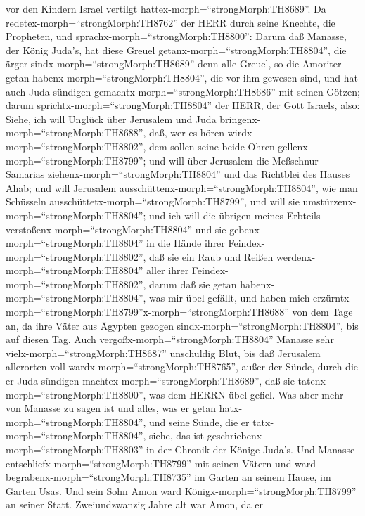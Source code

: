 vor den Kindern Israel vertilgt hattex-morph=``strongMorph:TH8689''.
 Da redetex-morph=``strongMorph:TH8762'' der HERR durch
seine Knechte, die Propheten, und sprachx-morph=``strongMorph:TH8800'':
 Darum daß Manasse, der König Juda's, hat diese Greuel
getanx-morph=``strongMorph:TH8804'', die ärger
sindx-morph=``strongMorph:TH8689'' denn alle Greuel, so die Amoriter
getan habenx-morph=``strongMorph:TH8804'', die vor ihm gewesen sind, und
hat auch Juda sündigen gemachtx-morph=``strongMorph:TH8686'' mit seinen
Götzen;  darum sprichtx-morph=``strongMorph:TH8804'' der
HERR, der Gott Israels, also: Siehe, ich will Unglück über Jerusalem und
Juda bringenx-morph=``strongMorph:TH8688'', daß, wer es hören
wirdx-morph=``strongMorph:TH8802'', dem sollen seine beide Ohren
gellenx-morph=``strongMorph:TH8799'';  und will über
Jerusalem die Meßschnur Samarias ziehenx-morph=``strongMorph:TH8804''
und das Richtblei des Hauses Ahab; und will Jerusalem
ausschüttenx-morph=``strongMorph:TH8804'', wie man Schüsseln
ausschüttetx-morph=``strongMorph:TH8799'', und will sie
umstürzenx-morph=``strongMorph:TH8804'';  und ich will die
übrigen meines Erbteils verstoßenx-morph=``strongMorph:TH8804'' und sie
gebenx-morph=``strongMorph:TH8804'' in die Hände ihrer
Feindex-morph=``strongMorph:TH8802'', daß sie ein Raub und Reißen
werdenx-morph=``strongMorph:TH8804'' aller ihrer
Feindex-morph=``strongMorph:TH8802'',  darum daß sie getan
habenx-morph=``strongMorph:TH8804'', was mir übel gefällt, und haben
mich erzürntx-morph=``strongMorph:TH8799''x-morph=``strongMorph:TH8688''
von dem Tage an, da ihre Väter aus Ägypten gezogen
sindx-morph=``strongMorph:TH8804'', bis auf diesen Tag. 
Auch vergoßx-morph=``strongMorph:TH8804'' Manasse sehr
vielx-morph=``strongMorph:TH8687'' unschuldig Blut, bis daß Jerusalem
allerorten voll wardx-morph=``strongMorph:TH8765'', außer der Sünde,
durch die er Juda sündigen machtex-morph=``strongMorph:TH8689'', daß sie
tatenx-morph=``strongMorph:TH8800'', was dem HERRN übel gefiel.
 Was aber mehr von Manasse zu sagen ist und alles, was er
getan hatx-morph=``strongMorph:TH8804'', und seine Sünde, die er
tatx-morph=``strongMorph:TH8804'', siehe, das ist
geschriebenx-morph=``strongMorph:TH8803'' in der Chronik der Könige
Juda's.  Und Manasse
entschliefx-morph=``strongMorph:TH8799'' mit seinen Vätern und ward
begrabenx-morph=``strongMorph:TH8735'' im Garten an seinem Hause, im
Garten Usas. Und sein Sohn Amon ward Königx-morph=``strongMorph:TH8799''
an seiner Statt.  Zweiundzwanzig Jahre alt war Amon, da er
